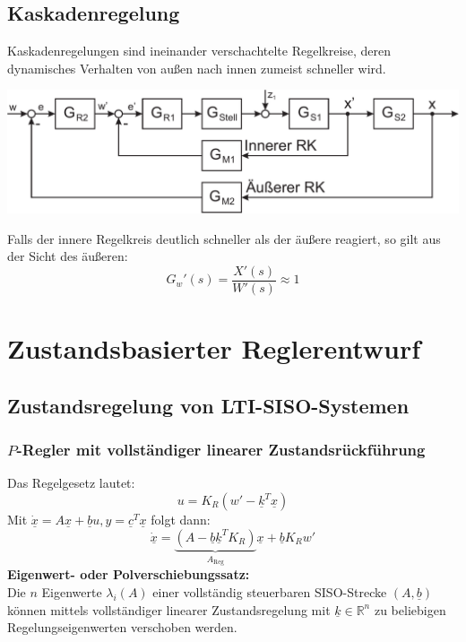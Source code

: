 \documentclass[a4paper,twocolumn,10pt]{article}
\begin{document}
\subsection{Kaskadenregelung}
Kaskadenregelungen sind ineinander verschachtelte Regelkreise, deren dynamisches Verhalten von außen nach innen zumeist schneller wird.
\begin{center}
\includegraphics[width=0.95\columnwidth]{Grafiken/Kaskadenregelung}
\end{center}
Falls der innere Regelkreis deutlich schneller als der äußere reagiert, so gilt aus der Sicht des äußeren:
\begin{equation*}
G_w'(s)=\frac{X'(s)}{W'(s)}\approx 1
\end{equation*}

\section{Zustandsbasierter Reglerentwurf}

\subsection{Zustandsregelung von LTI-SISO-Systemen}

\subsubsection{$P$-Regler mit vollständiger linearer Zustandsrückführung}
Das Regelgesetz lautet:
\begin{equation*}
u=K_R\left(w'-\underline{k}^T\underline{x}\right)
\end{equation*}
Mit $\underline{\dot{x}}=A\underline{x}+\underline{b}u,y=\underline{c}^T\underline{x}$ folgt dann:
\begin{equation*}
\underline{\dot{x}}=\underbrace{\left(A-\underline{b}\underline{k}^TK_R\right)}_{A_{\text{Reg}}}\underline{x}+\underline{b}K_Rw'
\end{equation*}
\textbf{Eigenwert- oder Polverschiebungssatz:}\\
Die $n$ Eigenwerte $\lambda_i(A)$ einer vollständig steuerbaren SISO-Strecke $(A,\underline{b})$ können mittels vollständiger linearer Zustandsregelung mit $\underline{k}\in\mathbb{R}^n$ zu beliebigen Regelungseigenwerten verschoben werden.
\end{document}
